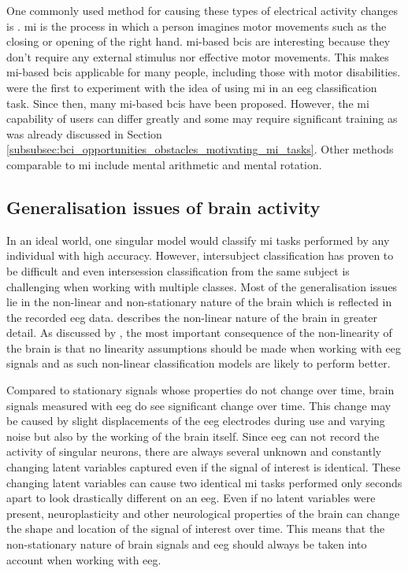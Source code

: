 One commonly used method for causing these types of electrical activity changes is .
\Gls{mi} is the process in which a person imagines motor movements such as the closing or opening of the right hand.
\Gls{mi}-based \glspl{bci} are interesting because they don't require any external stimulus nor effective motor movements.
This makes \gls{mi}-based \glspl{bci} applicable for many people, including those with motor disabilities.
 were the first to experiment with the idea of using \gls{mi} in an \gls{eeg} classification task.
Since then, many \gls{mi}-based \glspl{bci} have been proposed.
However, the \gls{mi} capability of users can differ greatly and some may require significant training as was already discussed in Section \ref{subsubsec:bci_opportunities_obstacles_motivating_mi_tasks}.
Other methods comparable to \gls{mi} include mental arithmetic and mental rotation.


\subsection{Generalisation issues of brain activity}
\label{subsec:biomedical_signals_working_with_eeg_generalisation}

In an ideal world, one singular model would classify \gls{mi} tasks performed by any individual with high accuracy.
However, intersubject classification has proven to be difficult and even intersession classification from the same subject is challenging when working with multiple classes.
Most of the generalisation issues lie in the non-linear and non-stationary nature of the brain which is reflected in the recorded \gls{eeg} data.
 describes the non-linear nature of the brain in greater detail.
As discussed by \citet{bci_applications}, the most important consequence of the non-linearity of the brain is that no linearity assumptions should be made when working with \gls{eeg} signals and as such non-linear classification models are likely to perform better.

Compared to stationary signals whose properties do not change over time, brain signals measured with \gls{eeg} do see significant change over time.
This change may be caused by slight displacements of the \gls{eeg} electrodes during use and varying noise but also by the working of the brain itself.
Since \gls{eeg} can not record the activity of singular neurons, there are always several unknown and constantly changing latent variables captured even if the signal of interest is identical.
These changing latent variables can cause two identical \gls{mi} tasks performed only seconds apart to look drastically different on an \gls{eeg}.
Even if no latent variables were present, neuroplasticity and other neurological properties of the brain can change the shape and location of the signal of interest over time.
This means that the non-stationary nature of brain signals and \gls{eeg} should always be taken into account when working with \gls{eeg}.

